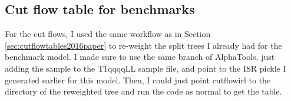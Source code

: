 \subsection{Cut flow table for benchmarks}

For the cut flows, I used the same workflow as in Section \ref{sec:cutflowtables2016paper} to re-weight the split trees I already had for the benchmark model. I made sure to use the same branch of AlphaTools, just adding the sample to the T1qqqqLL sample file, and point to the ISR pickle I generated earlier for this model. Then, I could just point cutflowirl to the directory of the reweighted tree and run the code as normal to get the table.

\begin{table}[H]
\caption{Cut flow table for \texttt{T2tt-4bd} model.}
\end{table}


